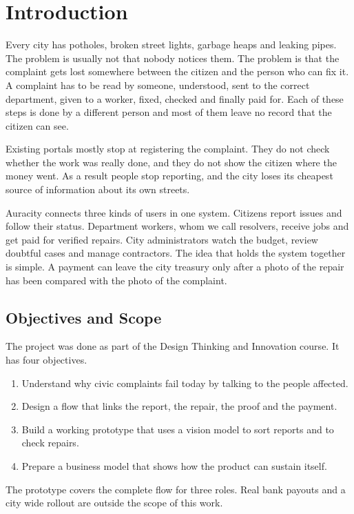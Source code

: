 \documentclass[conference,a4paper]{IEEEtran}
\begin{document}
\section{Introduction}
Every city has potholes, broken street lights, garbage heaps and leaking pipes. The problem is usually not that nobody notices them. The problem is that the complaint gets lost somewhere between the citizen and the person who can fix it. A complaint has to be read by someone, understood, sent to the correct department, given to a worker, fixed, checked and finally paid for. Each of these steps is done by a different person and most of them leave no record that the citizen can see.

Existing portals mostly stop at registering the complaint. They do not check whether the work was really done, and they do not show the citizen where the money went. As a result people stop reporting, and the city loses its cheapest source of information about its own streets.

Auracity connects three kinds of users in one system. Citizens report issues and follow their status. Department workers, whom we call resolvers, receive jobs and get paid for verified repairs. City administrators watch the budget, review doubtful cases and manage contractors. The idea that holds the system together is simple. A payment can leave the city treasury only after a photo of the repair has been compared with the photo of the complaint.

\subsection{Objectives and Scope}
The project was done as part of the Design Thinking and Innovation course. It has four objectives.
\begin{enumerate}
\item Understand why civic complaints fail today by talking to the people affected.
\item Design a flow that links the report, the repair, the proof and the payment.
\item Build a working prototype that uses a vision model to sort reports and to check repairs.
\item Prepare a business model that shows how the product can sustain itself.
\end{enumerate}
The prototype covers the complete flow for three roles. Real bank payouts and a city wide rollout are outside the scope of this work.
\end{document}
